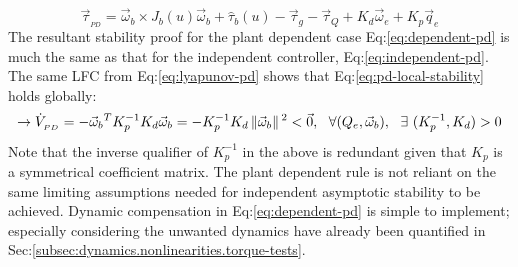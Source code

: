 {\begin{equation}
\vec{\tau}_{_{PD}}=\vec{\omega}_b\times J_b(u)\vec{\omega}_b+\hat{\tau}_b(u)-\vec{\tau}_g-\vec{\tau}_Q+K_d\vec{\omega}_e+K_p\vec{q}_e
\end{equation}
The resultant stability proof for the plant dependent case Eq:\ref{eq:dependent-pd} is much the same as that for the independent controller, Eq:\ref{eq:independent-pd}. The same LFC from Eq:\ref{eq:lyapunov-pd} shows that Eq:\ref{eq:pd-local-stability} holds globally:
\begin{equation}\label{eq:dependent-global-stability}
\rightarrow\dot{V}_{_{PD}}=-\vec{\omega}_b\text{}^TK_p^{-1}K_d\vec{\omega}_b=-K_p^{-1}K_d\left\lVert\vec{\omega}_b\right\rVert\text{}^2<\vec{0},~~\forall(Q_e,\vec{\omega}_b),~~\exists~(K_p^{-1},K_d)>0
\end{equation}
Note that the inverse qualifier of $K_p^{-1}$ in the above is redundant given that $K_p$ is a symmetrical coefficient matrix. The plant dependent rule is not reliant on the same limiting assumptions needed for independent asymptotic stability to be achieved. Dynamic compensation in Eq:\ref{eq:dependent-pd} is simple to implement; especially considering the unwanted dynamics have already been quantified in Sec:\ref{subsec:dynamics.nonlinearities.torque-tests}.
}
